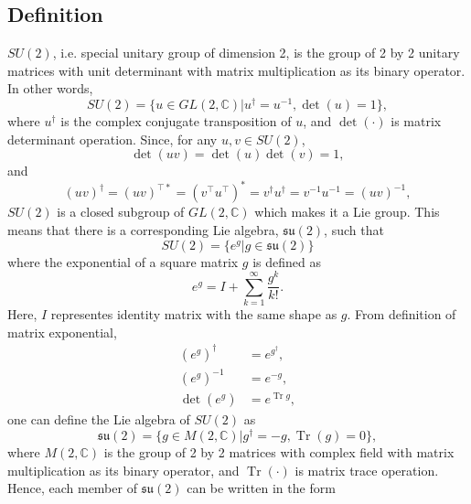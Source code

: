 \documentclass[preprint, 12pt]{revtex4-2}
\DeclareMathOperator{\Tr}{Tr}
\numberwithin{equation}{section}
\begin{document}
\subsection{Definition}
$SU(2)$, i.e. special unitary group of dimension 2, is the group of 2 by 2 unitary matrices with unit determinant with matrix multiplication as its binary operator. In other words,
\begin{equation}\label{eq:SU2}
    SU(2) = \{u \in GL(2, \mathbb{C})|u^\dagger=u^{-1}, \det(u) = 1\},
\end{equation}    
where $u^\dagger$ is the complex conjugate transposition of $u$, and $\det(\cdot)$ is matrix determinant operation. Since, for any $u, v \in SU(2)$,
\begin{equation}\label{eq:determinant identity}
    \det(uv) = \det(u)\det(v) = 1,
\end{equation}
and
\begin{equation}\label{eq:unitary closed}
    (uv)^\dagger = (uv)^{\top\ast} = (v^\top u^\top)^\ast = v^\dagger u^\dagger = v^{-1}u^{-1} = (uv)^{-1},
\end{equation}
$SU(2)$ is a closed subgroup of $GL(2, \mathbb{C})$ which makes it a Lie group. This means that there is a corresponding Lie algebra, $\mathfrak{su(2)}$, such that 
\begin{equation}\label{eq:SU2 Lie group}
    SU(2) = \{e^g|g \in \mathfrak{su(2)}\}
\end{equation}
where the exponential of a square matrix $g$ is defined as
\begin{equation}\label{eq:matrix exponential}
    e^g = I + \sum_{k=1}^{\infty}\dfrac{g^k}{k!}.
\end{equation}
Here, $I$ representes identity matrix with the same shape as $g$. From definition of matrix exponential,
\begin{equation}\label{eq:matrix exponential properties}
    \begin{aligned}
        (e^g)^\dagger &= e^{g^\dagger}, \\
        (e^g)^{-1} &= e^{-g}, \\
        \det(e^g) &= e^{\Tr g},
    \end{aligned}
\end{equation}
one can define the Lie algebra of $SU(2)$ as
\begin{equation}\label{eq:su2}
    \mathfrak{su(2)} = \{g \in M(2, \mathbb{C})|g^\dagger=-g, \Tr(g) = 0\},
\end{equation}
where $M(2,\mathbb{C})$ is the group of 2 by 2 matrices with complex field with matrix multiplication as its binary operator, and $\Tr(\cdot)$ is matrix trace operation. Hence, each member of $\mathfrak{su(2)}$ can be written in the form
\end{document}
